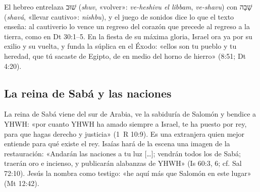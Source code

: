 \documentclass[11pt,letterpaper]{article}
\newcommand{\heb}[1]{\mbox{\foreignlanguage{hebrew}{#1}}}
\begin{document}
El hebreo entrelaza \heb{שׁוּב} (\emph{shuv}, «volver»: \emph{ve-heshivu el libbam}, \emph{ve-shavu}) con \heb{שָׁבָה} (\emph{shavá}, «llevar cautivo»: \emph{nishbu}), y el juego de sonidos dice lo que el texto enseña: al cautiverio lo vence un regreso del corazón que precede al regreso a la tierra, como en Dt 30:1--5. En la fiesta de su máxima gloria, Israel ora ya por su exilio y su vuelta, y funda la súplica en el Éxodo: «ellos son tu pueblo y tu heredad, que tú sacaste de Egipto, de en medio del horno de hierro» (8:51; Dt 4:20).

\subsection{La reina de Sabá y las naciones}
La reina de Sabá viene del sur de Arabia, ve la sabiduría de Salomón y bendice a YHWH: «por cuanto YHWH ha amado siempre a Israel, te ha puesto por rey, para que hagas derecho y justicia» (1~R 10:9). Es una extranjera quien mejor entiende para qué existe el rey. Isaías hará de la escena una imagen de la restauración: «Andarán las naciones a tu luz [\ldots]; vendrán todos los de Sabá; traerán oro e incienso, y publicarán alabanzas de YHWH» (Is 60:3, 6; cf. Sal 72:10). Jesús la nombra como testigo: «he aquí más que Salomón en este lugar» (Mt 12:42).
\end{document}
